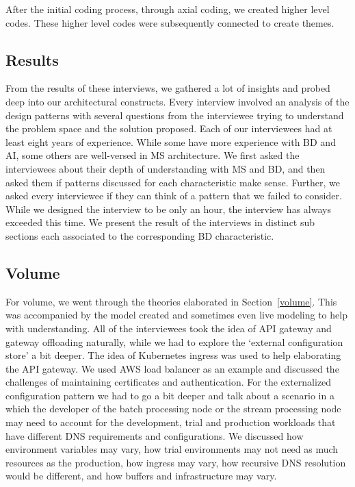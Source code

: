 \documentclass{bmcart}
\begin{document}
After the initial coding process, through axial coding, we created higher level codes. These higher level codes were subsequently connected to create themes. 


\subsection{Results}

From the results of these interviews, we gathered a lot of insights and probed deep into our architectural constructs. Every interview involved an analysis of the design patterns with several questions from the interviewee trying to understand the problem space and the solution proposed. Each of our interviewees had at least eight years of experience. While some have more experience with BD and AI, some others are well-versed in MS architecture. We first asked the interviewees about their depth of understanding with MS and BD, and then asked them if patterns discussed for each characteristic make sense. Further, we asked every interviewee if they can think of a pattern that we failed to consider. While we designed the interview to be only an hour, the interview has always exceeded this time. We present the result of the interviews in distinct sub sections each associated to the corresponding BD characteristic.



\subsection{Volume}

For volume, we went through the theories elaborated in Section~\ref{volume}. This was accompanied by the model created and sometimes even live modeling to help with understanding. All of the interviewees took the idea of API gateway and gateway offloading naturally, while we had to explore the `external configuration store' a bit deeper. The idea of Kubernetes ingress was used to help elaborating the API gateway. We used AWS load balancer as an example and discussed the challenges of maintaining certificates and authentication. For the externalized configuration pattern we had to go a bit deeper and talk about a scenario in a which the developer of the batch processing node or the stream processing node may need to account for the development, trial and production workloads that have different DNS requirements and configurations. We discussed how environment variables may vary, how trial environments may not need as much resources as the production, how ingress may vary, how recursive DNS resolution would be different, and how buffers and infrastructure may vary. 
\end{document}
